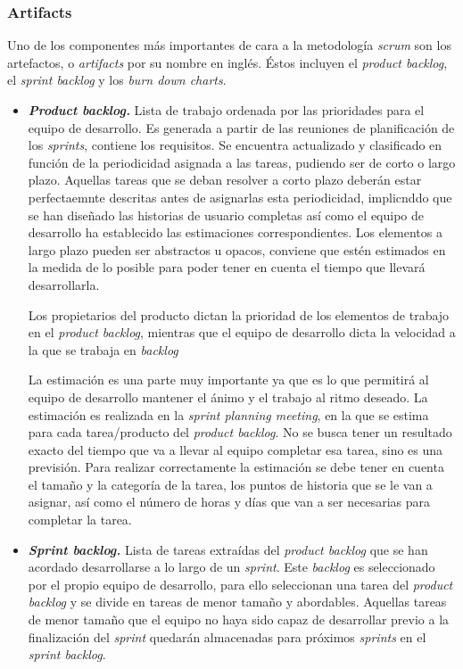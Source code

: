 \subsubsection{Artifacts}
Uno de los componentes más importantes de cara a la metodología \textit{scrum} son los artefactos, o \textit{artifacts} por su nombre en inglés. Éstos incluyen el \textit{product backlog}, el \textit{sprint backlog} y los \textit{burn down charts}.
\begin{itemize}
\item \textbf{\textit{Product backlog.}} Lista de trabajo ordenada por las prioridades para el equipo de desarrollo. Es generada a partir de las reuniones de planificación de los \textit{sprints}, contiene los requisitos. Se encuentra actualizado y clasificado en función de la periodicidad asignada a las tareas, pudiendo ser de corto o largo plazo. Aquellas tareas que se deban resolver a corto plazo deberán estar perfectaemnte descritas antes de asignarlas esta periodicidad, implicnddo que se han diseñado las historias de usuario completas así como el equipo de desarrollo ha establecido las estimaciones correspondientes. Los elementos a largo plazo pueden ser abstractos u opacos, conviene que estén estimados en la medida de lo posible para poder tener en cuenta el tiempo que llevará desarrollarla.

Los propietarios del producto dictan la prioridad de los elementos de trabajo en el \textit{product backlog}, mientras que el equipo de desarrollo dicta la velocidad a la que se trabaja en \textit{backlog}~\cite{danradigan2021}

La estimación es una parte muy importante ya que es lo que permitirá al equipo de desarrollo mantener el ánimo y el trabajo al ritmo deseado. La estimación es realizada en la \textit{sprint planning meeting}, en la que se estima para cada tarea/producto del \textit{product backlog}. No se busca tener un resultado exacto del tiempo que va a llevar al equipo completar esa tarea, sino es una previsión. Para realizar correctamente la estimación se debe tener en cuenta el tamaño y la categoría de la tarea, los puntos de historia que se le van a asignar, así como el número de horas y días que van a ser necesarias para completar la tarea. 

\item \textbf{\textit{Sprint backlog.}} Lista de tareas extraídas del \textit{product backlog} que se han acordado desarrollarse a lo largo de un \textit{sprint}. Este \textit{backlog} es seleccionado por el propio equipo de desarrollo, para ello seleccionan una tarea del \textit{product backlog} y se divide en tareas de menor tamaño y abordables. Aquellas tareas de menor tamaño que el equipo no haya sido capaz de desarrollar previo a la finalización del \textit{sprint} quedarán almacenadas para próximos \textit{sprints} en el \textit{sprint backlog}.
\end{itemize}

